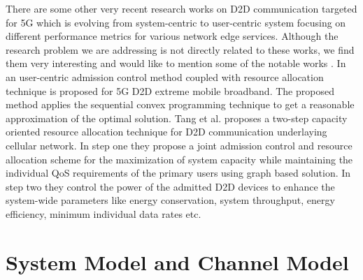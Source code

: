 \documentclass{ieeeaccess}
\begin{document}
There are some other very recent research works on D2D communication targeted for 5G which is evolving from system-centric  to user-centric system \cite{marsch2016preliminary,chen2016user} focusing on different performance metrics for various network edge services. Although the research problem we are addressing is not directly related to these works, we find them very interesting and would like to mention some of the notable works \cite{tang2017user,tangcapacity}. In \cite{tang2017user} an user-centric admission control method coupled with resource allocation technique is proposed for 5G D2D extreme mobile broadband. The proposed method applies the sequential convex programming technique to get a reasonable approximation of the optimal solution. Tang et al. \cite{tangcapacity} proposes a two-step capacity oriented resource allocation technique for D2D communication underlaying cellular network. In step one they propose a joint admission control and resource allocation scheme for the maximization of system capacity while maintaining the individual QoS requirements of the primary users using graph based solution. In step two they control the power of the admitted D2D devices to enhance the system-wide parameters like energy conservation, system throughput, energy efficiency, minimum individual data rates etc.


\section{System Model and Channel Model}\label{sec:systemModel}
 
\end{document}
